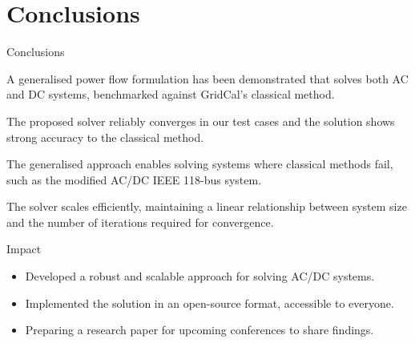\section{Conclusions}
\begin{frame}{}
    \tableofcontents[currentsection]
\end{frame}

\begin{frame}{Conclusions}
 
    \textcolor{green}{} A generalised power flow formulation has been demonstrated that solves both AC and DC systems, benchmarked against GridCal's classical method.

    \textcolor{green}{} The proposed solver reliably converges in our test cases and the solution shows strong accuracy to the classical method.

    \textcolor{green}{} The generalised approach enables solving systems where classical methods fail, such as the modified AC/DC IEEE 118-bus system.
   
    \textcolor{green}{} The solver scales efficiently, maintaining a linear relationship between system size and the number of iterations required for convergence.
    
\end{frame}


\begin{frame}{Impact}
    \begin{itemize}
        \item Developed a robust and scalable approach for solving AC/DC systems.
        \item Implemented the solution in an open-source format, accessible to everyone.
        \item Preparing a research paper for upcoming conferences to share findings.
    \end{itemize}
\end{frame}



